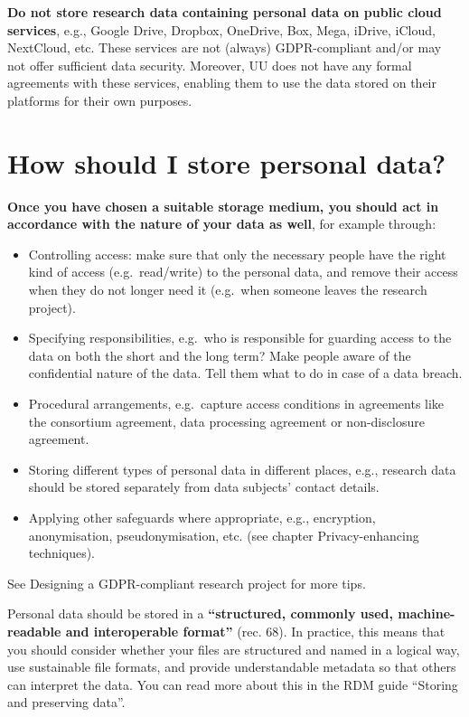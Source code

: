 \documentclass[
]{book}
\providecommand{\tightlist}{%
  \setlength{\itemsep}{0pt}\setlength{\parskip}{0pt}}
\begin{document}
\textbf{Do not store research data containing personal data on public cloud services},
e.g., Google Drive, Dropbox, OneDrive, Box, Mega, iDrive, iCloud, NextCloud, etc.
These services are not (always) GDPR-compliant and/or may not offer sufficient
data security. Moreover, UU does not have any formal agreements with these
services, enabling them to use the data stored on their platforms for their own
purposes.

\hypertarget{data-storage-how}{%
\section{How should I store personal data?}\label{data-storage-how}}

\textbf{Once you have chosen a suitable storage medium, you should act in accordance
with the nature of your data as well}, for example through:

\begin{itemize}
\tightlist
\item
  Controlling access: make sure that only the necessary people have the right
  kind of access (e.g.~read/write) to the personal data, and remove their access
  when they do not longer need it (e.g.~when someone leaves the research project).\\
\item
  Specifying responsibilities, e.g.~who is responsible for guarding access to the
  data on both the short and the long term? Make people aware of the confidential
  nature of the data. Tell them what to do in case of a
  data breach.
\item
  Procedural arrangements, e.g.~capture access conditions in
  agreements like the consortium agreement,
  data processing agreement or non-disclosure agreement.
\item
  Storing different types of personal data in different places, e.g., research
  data should be stored separately from data subjects' contact details.
\item
  Applying other safeguards where appropriate, e.g., encryption, anonymisation,
  pseudonymisation, etc. (see chapter Privacy-enhancing
  techniques).
\end{itemize}

See Designing a GDPR-compliant research project for more tips.

Personal data should be stored in a \textbf{``structured, commonly used, machine-readable
and interoperable format''} (rec. 68).
In practice, this means that you should consider whether your files are
structured and named in a logical way, use
sustainable file formats,
and provide understandable metadata so that others can interpret the data.
You can read more about this in the RDM guide
``Storing and preserving data''.
\end{document}
